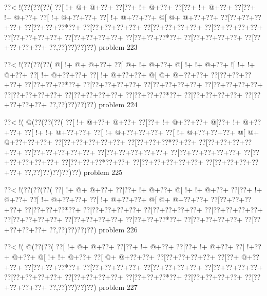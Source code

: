 \vbox{\vbox{\goo
\0??<\- !(\0??(\0??(\0??(
\0??[\- !+\- @+\- @+\0??+
\0??[\0??+\- !+\- @+\0??+
\0??[\0??+\- !+\- @+\0??+
\0??[\0??+\- !+\- @+\0??+
\0??[\- !+\- @+\0??+\0??+
\0??[\- !+\- @+\0??+\0??+
\- @[\- @+\- @+\0??+\0??+
\0??[\0??+\0??+\0??+\0??+
\0??[\0??+\0??+\0??*\0??+
\0??[\0??+\0??+\0??+\0??+
\0??[\0??+\0??+\0??+\0??+
\0??[\0??+\0??+\0??+\0??+
\0??[\0??+\0??+\0??+\0??+
\0??[\0??+\0??+\0??+\0??+
\0??[\0??+\0??+\0??*\0??+
\0??[\0??+\0??+\0??+\0??+
\0??[\0??+\0??+\0??+\0??+
\0??,\0??)\0??)\0??)\0??)
}
\hfil problem 223\hfil\break
}

\vbox{\vbox{\goo
\0??<\- !(\0??(\0??(\0??(
\- @[\- !+\- @+\- @+\0??+
\0??[\- @+\- !+\- @+\0??+
\- @[\- !+\- !+\- @+\0??+
\- ![\- !+\- !+\- @+\0??+
\0??[\- !+\- @+\0??+\0??+
\0??[\- !+\- @+\0??+\0??+
\- @[\- @+\- @+\0??+\0??+
\0??[\0??+\0??+\0??+\0??+
\0??[\0??+\0??+\0??*\0??+
\0??[\0??+\0??+\0??+\0??+
\0??[\0??+\0??+\0??+\0??+
\0??[\0??+\0??+\0??+\0??+
\0??[\0??+\0??+\0??+\0??+
\0??[\0??+\0??+\0??+\0??+
\0??[\0??+\0??+\0??*\0??+
\0??[\0??+\0??+\0??+\0??+
\0??[\0??+\0??+\0??+\0??+
\0??,\0??)\0??)\0??)\0??)
}
\hfil problem 224\hfil\break
}

\vbox{\vbox{\goo
\0??<\- !(\- @(\0??(\0??(\0??(
\0??[\- !+\- @+\0??+\- @+\0??+
\0??[\0??+\- !+\- @+\0??+\0??+
\- @[\0??+\- !+\- @+\0??+\0??+
\0??[\- !+\- !+\- @+\0??+\0??+
\0??[\- !+\- @+\0??+\0??+\0??+
\0??[\- !+\- @+\0??+\0??+\0??+
\- @[\- @+\- @+\0??+\0??+\0??+
\0??[\0??+\0??+\0??+\0??+\0??+
\0??[\0??+\0??+\0??*\0??+\0??+
\0??[\0??+\0??+\0??+\0??+\0??+
\0??[\0??+\0??+\0??+\0??+\0??+
\0??[\0??+\0??+\0??+\0??+\0??+
\0??[\0??+\0??+\0??+\0??+\0??+
\0??[\0??+\0??+\0??+\0??+\0??+
\0??[\0??+\0??+\0??*\0??+\0??+
\0??[\0??+\0??+\0??+\0??+\0??+
\0??[\0??+\0??+\0??+\0??+\0??+
\0??,\0??)\0??)\0??)\0??)\0??)
}
\hfil problem 225\hfil\break
}

\vbox{\vbox{\goo
\0??<\- !(\0??(\0??(\0??(
\0??[\- !+\- @+\- @+\0??+
\0??[\0??+\- !+\- @+\0??+
\- @[\- !+\- !+\- @+\0??+
\0??[\0??+\- !+\- @+\0??+
\0??[\- !+\- @+\0??+\0??+
\0??[\- !+\- @+\0??+\0??+
\- @[\- @+\- @+\0??+\0??+
\0??[\0??+\0??+\0??+\0??+
\0??[\0??+\0??+\0??*\0??+
\0??[\0??+\0??+\0??+\0??+
\0??[\0??+\0??+\0??+\0??+
\0??[\0??+\0??+\0??+\0??+
\0??[\0??+\0??+\0??+\0??+
\0??[\0??+\0??+\0??+\0??+
\0??[\0??+\0??+\0??*\0??+
\0??[\0??+\0??+\0??+\0??+
\0??[\0??+\0??+\0??+\0??+
\0??,\0??)\0??)\0??)\0??)
}
\hfil problem 226\hfil\break
}

\vbox{\vbox{\goo
\0??<\- !(\- @(\0??(\0??(
\0??[\- !+\- @+\- @+\0??+
\0??[\0??+\- !+\- @+\0??+
\0??[\0??+\- !+\- @+\0??+
\0??[\- !+\0??+\- @+\0??+
\- @[\- !+\- !+\- @+\0??+
\0??[\- @+\- @+\0??+\0??+
\0??[\0??+\0??+\0??+\0??+
\0??[\0??+\- @+\0??+\0??+
\0??[\0??+\0??+\0??*\0??+
\0??[\0??+\0??+\0??+\0??+
\0??[\0??+\0??+\0??+\0??+
\0??[\0??+\0??+\0??+\0??+
\0??[\0??+\0??+\0??+\0??+
\0??[\0??+\0??+\0??+\0??+
\0??[\0??+\0??+\0??*\0??+
\0??[\0??+\0??+\0??+\0??+
\0??[\0??+\0??+\0??+\0??+
\0??,\0??)\0??)\0??)\0??)
}
\hfil problem 227\hfil\break
}


